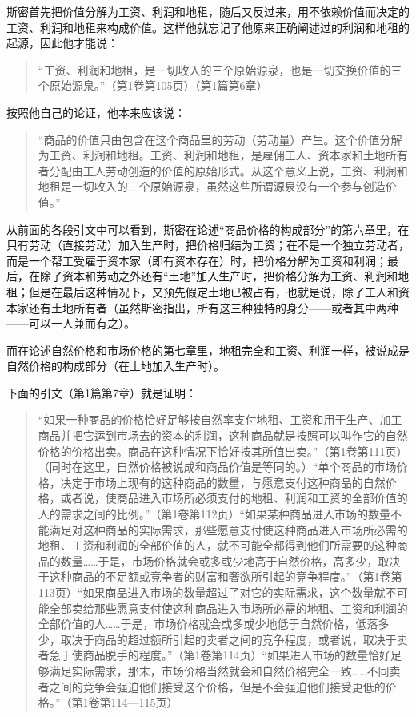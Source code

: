 斯密首先把价值分解为工资、利润和地租，随后又反过来，用不依赖价值而决定的工资、利润和地租来构成价值。这样他就忘记了他原来正确阐述过的利润和地租的起源，因此他才能说：

\begin{quote}{“工资、利润和地租，是一切收入的三个原始源泉，也是一切交换价值的三个原始源泉。”（第1卷第105页）（第1篇第6章）}\end{quote}

按照他自己的论证，他本来应该说：

\begin{quote}{“商品的价值只由包含在这个商品里的劳动（劳动量）产生。这个价值分解为工资、利润和地租。工资、利润和地租，是雇佣工人、资本家和土地所有者分配由工人劳动创造的价值的原始形式。从这个意义上说，工资、利润和地租是一切收入的三个原始源泉，虽然这些所谓源泉没有一个参与创造价值。”}\end{quote}

从前面的各段引文中可以看到，斯密在论述“商品价格的构成部分”的第六章里，在只有劳动（直接劳动）加入生产时，把价格归结为工资；在不是一个独立劳动者，而是一个帮工受雇于资本家（即有资本存在）时，把价格分解为工资和利润；最后，在除了资本和劳动之外还有“土地”加入生产时，把价格分解为工资、利润和地租；但是在最后这种情况下，又预先假定土地已被占有，也就是说，除了工人和资本家还有土地所有者（虽然斯密指出，所有这三种独特的身分——或者其中两种——可以一人兼而有之）。

而在论述自然价格和市场价格的第七章里，地租完全和工资、利润一样，被说成是自然价格的构成部分（在土地加入生产时）。

下面的引文（第1篇第7章）就是证明：

\begin{quote}{“如果一种商品的价格恰好足够按自然率支付地租、工资和用于生产、加工商品并把它运到市场去的资本的利润，这种商品就是按照可以叫作它的自然价格的价格出卖。商品在这种情况下恰好按其所值出卖。”（第1卷第111页）（同时在这里，自然价格被说成和商品价值是等同的。）“单个商品的市场价格，决定于市场上现有的这种商品的数量，与愿意支付这种商品的自然价格，或者说，使商品进入市场所必须支付的地租、利润和工资的全部价值的人的需求之间的比例。”（第1卷第112页）“如果某种商品进入市场的数量不能满足对这种商品的实际需求，那些愿意支付使这种商品进入市场所必需的地租、工资和利润的全部价值的人，就不可能全都得到他们所需要的这种商品的数量……于是，市场价格就会或多或少地高于自然价格，高多少，取决于这种商品的不足额或竞争者的财富和奢欲所引起的竞争程度。”（第1卷第113页）“如果商品进入市场的数量超过了对它的实际需求，这个数量就不可能全部卖给那些愿意支付使这种商品进入市场所必需的地租、工资和利润的全部价值的人……于是，市场价格就会或多或少地低于自然价格，低落多少，取决于商品的超过额所引起的卖者之间的竞争程度，或者说，取决于卖者急于使商品脱手的程度。”（第1卷第114页）“如果进入市场的数量恰好足够满足实际需求，那末，市场价格当然就会和自然价格完全一致……不同卖者之间的竞争会强迫他们接受这个价格，但是不会强迫他们接受更低的价格。”（第1卷第114—115页）}\end{quote}

